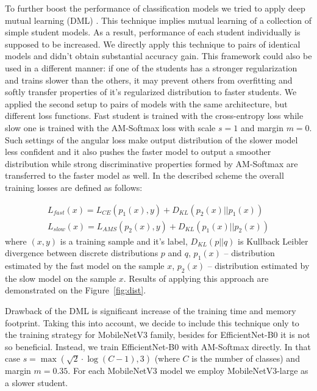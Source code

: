 \documentclass[runningheads]{llncs}
\begin{document}
To further boost the performance of classification models we tried to apply deep mutual learning (DML) \cite{Zhang2018DeepML}.
This technique implies mutual learning of a collection of simple student models. As a result, performance of each student
individually is supposed to be increased. We directly apply this technique to pairs of identical models and didn't
obtain substantial accuracy gain. This framework could also be used in a different manner: if one of the students
has a stronger regularization and trains slower than the others, it may prevent others from overfitting and
softly transfer properties of it's regularized distribution to faster students. We applied the second setup
to pairs of models with the same architecture, but different loss functions. Fast student is trained with the
cross-entropy loss while slow one is trained with the AM-Softmax\cite{AMSoftmax} loss with scale $s=1$ and margin $m=0$.
Such settings of the angular loss make output distribution of the slower model less confident and it also pushes
the faster model to output a smoother distribution while strong discriminative properties formed
by AM-Softmax are transferred to the faster model as well.
In the described scheme the overall training losses are defined as follows:

\begin{displaymath}
  \label{eq:equationDML}
  \begin{split}
    L_{fast}(x) = L_{CE}(p_1(x), y) + D_{KL}(p_2(x) || p_1(x))\\
    L_{slow}(x) = L_{AMS}(p_2(x), y) + D_{KL}(p_1(x) || p_2(x))
  \end{split}
\end{displaymath}
where $(x,y)$ is a training sample and it's label, $D_{KL}(p||q)$ is Kullback Leibler divergence between discrete distributions $p$ and $q$,
$p_1(x)$ -- distribution estimated by the fast model on the sample $x$,  $p_2(x)$ -- distribution estimated by the slow model on the sample $x$.
Results of applying this approach are demonstrated on the Figure~\ref{fig:dist}.

Drawback of the DML is significant increase of the training time and memory footprint. Taking this into account, we decide to include
this technique only to the training strategy for MobileNetV3 family, besides for EfficientNet-B0 it is not so beneficial.
Instead, we train EfficientNet-B0 with AM-Softmax directly. In that case  $s = \max(\sqrt{2} \cdot \log(C - 1), 3)$
(where $C$ is the number of classes) and margin $m=0.35$. For each MobileNetV3 model we employ MobileNetV3-large as a slower student.
\end{document}
